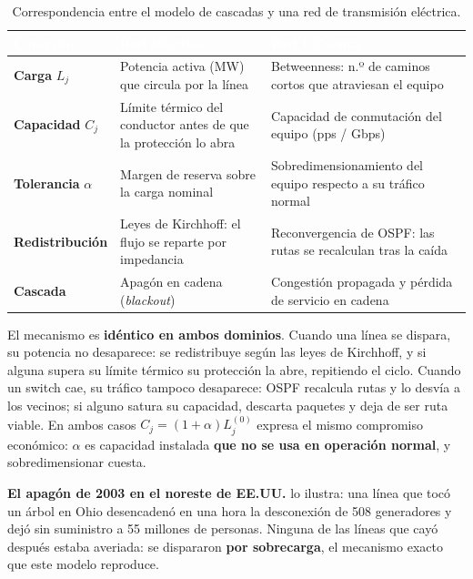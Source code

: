 \documentclass[11pt, a4paper]{article}
\newcommand{\encabezado}[1]{%
    \cellcolor{tabhead}\textcolor{white}{\textbf{#1}}}
\begin{document}
\begin{table}[htbp]
\centering
\caption{Correspondencia entre el modelo de cascadas y una red de
         transmisión eléctrica.}
\label{tab:analogia_electrica}
\small
\begin{tabular}{L{2.9cm} L{4.4cm} L{4.6cm}}
    \toprule
    \encabezado{Concepto} & \encabezado{Red eléctrica} &
    \encabezado{Red UCuenca} \\
    \midrule
    \textbf{Carga} $L_j$
      & Potencia activa (MW) que circula por la línea
      & Betweenness: n.º de caminos cortos que atraviesan el equipo \\
    \textbf{Capacidad} $C_j$
      & Límite térmico del conductor antes de que la protección lo abra
      & Capacidad de conmutación del equipo (pps / Gbps) \\
    \textbf{Tolerancia} $\alpha$
      & Margen de reserva sobre la carga nominal
      & Sobredimensionamiento del equipo respecto a su tráfico normal \\
    \textbf{Redistribución}
      & Leyes de Kirchhoff: el flujo se reparte por impedancia
      & Reconvergencia de OSPF: las rutas se recalculan tras la caída \\
    \textbf{Cascada}
      & Apagón en cadena (\textit{blackout})
      & Congestión propagada y pérdida de servicio en cadena \\
    \bottomrule
\end{tabular}
\end{table}

El mecanismo es \textbf{idéntico en ambos dominios}. Cuando una línea se
dispara, su potencia no desaparece: se redistribuye según las leyes de
Kirchhoff, y si alguna supera su límite térmico su protección la abre,
repitiendo el ciclo. Cuando un switch cae, su tráfico tampoco desaparece:
OSPF recalcula rutas y lo desvía a los vecinos; si alguno satura su
capacidad, descarta paquetes y deja de ser ruta viable. En ambos casos
$C_j = (1+\alpha)L_j^{(0)}$ expresa el mismo compromiso económico: $\alpha$
es capacidad instalada \textbf{que no se usa en operación normal}, y
sobredimensionar cuesta.

\textbf{El apagón de 2003 en el noreste de EE.UU.} lo ilustra: una línea que
tocó un árbol en Ohio desencadenó en una hora la desconexión de 508
generadores y dejó sin suministro a 55 millones de personas. Ninguna de las
líneas que cayó después estaba averiada: se dispararon \textbf{por
sobrecarga}, el mecanismo exacto que este modelo reproduce.
\end{document}
